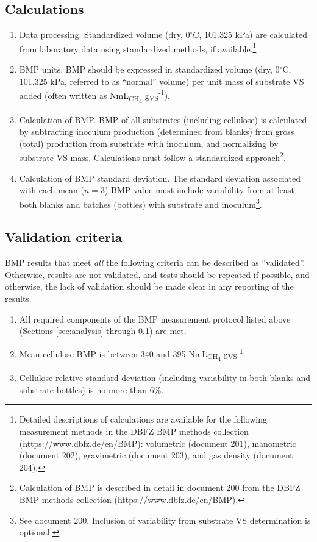\documentclass[]{article}
\begin{document}
\subsection{Calculations}
\label{sec:calculations}
\begin{enumerate}
  \item Data processing.
    Standardized  volume (dry, 0$^\circ$C, 101.325 kPa) are calculated from laboratory data using standardized methods, if available.\footnote{
      Detailed descriptions of calculations are available for the following measurement methods in the DBFZ BMP methods collection (\url{https://www.dbfz.de/en/BMP}): volumetric (document 201), manometric (document 202), gravimetric (document 203), and gas density (document 204).
    }
  \item BMP units.
    BMP should be expressed in standardized  volume (dry, 0$^\circ$C, 101.325 kPa, referred to as ``normal'' volume) per unit mass of substrate VS added (often written as NmL\textsubscript{CH\textsubscript{4}} g\textsubscript{VS}\textsuperscript{-1}). 
  \item Calculation of BMP.
    BMP of all substrates (including cellulose) is calculated by subtracting inoculum  production (determined from blanks) from gross (total)  production from substrate with inoculum, and normalizing by substrate VS mass.
    Calculations must follow a standardized approach\footnote{
      Calculation of BMP is described in detail in document 200 from the DBFZ BMP methods collection (\url{https://www.dbfz.de/en/BMP}).
    }.
  \item Calculation of BMP standard deviation.
    The standard deviation associated with each mean ($n = 3$) BMP value must include variability from at least both blanks and batches (bottles) with substrate and inoculum\footnote{
      See document 200. 
      Inclusion of variability from substrate VS determination is optional.
    }.
\end{enumerate}

\subsection{Validation criteria}
\label{sec:crit}
BMP results that meet \textit{all} the following criteria can be described as ``validated''.
Otherwise, results are not validated, and tests should be repeated if possible, and otherwise, the lack of validation should be made clear in any reporting of the results.

\begin{enumerate}
  \item All required components of the BMP measurement protocol listed above (Sections \ref{sec:analysis} through \ref{sec:calculations}) are met.
  \item Mean cellulose BMP is between 340 and 395 NmL\textsubscript{CH\textsubscript{4}} g\textsubscript{VS}\textsuperscript{-1}.
  \item Cellulose relative standard deviation (including variability in both blanks and substrate bottles) is no more than 6\%.
\end{enumerate}
\end{document}
